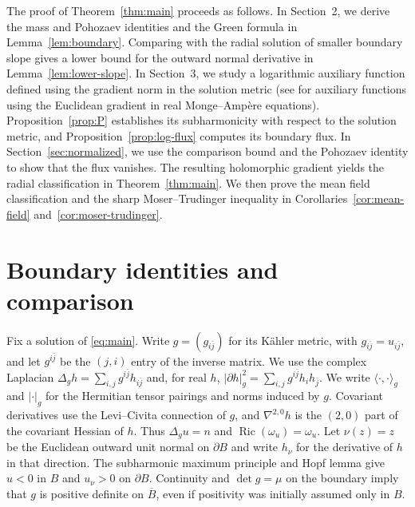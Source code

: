 \documentclass[11pt]{article}
\newcommand{\Ric}{\operatorname{Ric}}
\begin{document}
The proof of Theorem~\ref{thm:main} proceeds as follows.
In Section~2, we derive the mass and Pohozaev identities and
the Green formula in Lemma~\ref{lem:boundary}. Comparing with
the radial solution of smaller boundary slope gives a lower
bound for the outward normal derivative in
Lemma~\ref{lem:lower-slope}. In Section~3, we study a logarithmic auxiliary function defined
using the gradient norm in the solution metric (see
\cite{Enache2014} for auxiliary functions using the Euclidean
gradient in real Monge--Amp\`ere equations).
Proposition~\ref{prop:P} establishes its subharmonicity with
respect to the solution metric, and
Proposition~\ref{prop:log-flux} computes its boundary flux. 
In Section~\ref{sec:normalized}, we use the
comparison bound and the Pohozaev identity to show that the
flux vanishes. The resulting holomorphic gradient yields the
radial classification in Theorem~\ref{thm:main}. We then prove
the mean field classification and the sharp Moser--Trudinger
inequality in Corollaries~\ref{cor:mean-field}
and~\ref{cor:moser-trudinger}.

\section{Boundary identities and comparison}

Fix a solution of \eqref{eq:main}. Write $g=(g_{i\bar j})$ for its
K\"ahler metric, with $g_{i\bar j}=u_{i\bar j}$, and let
$g^{i\bar j}$ be the $(j,i)$ entry of the inverse matrix.
We use the complex Laplacian
$\Delta_gh=\sum_{i,j}g^{i\bar j}h_{i\bar j}$ and, for real $h$,
$|\partial h|_g^2=\sum_{i,j}g^{i\bar j}h_i h_{\bar j}$.
We write $\langle\cdot,\cdot\rangle_g$ and $|\cdot|_g$ for the
Hermitian tensor pairings and norms induced by $g$.
Covariant derivatives use the Levi--Civita connection of $g$, and
$\nabla^{2,0}h$ is the $(2,0)$ part of the covariant Hessian of $h$.
Thus $\Delta_gu=n$ and $\Ric(\omega_u)=\omega_u$.
Let $\nu(z)=z$ be the Euclidean outward unit normal on $\partial B$
and write $h_\nu$ for the derivative of $h$ in that direction.
The subharmonic maximum principle and Hopf lemma give $u<0$ in $B$
and $u_\nu>0$ on $\partial B$. Continuity and $\det g=\mu$ on the boundary imply
that $g$ is positive definite on $\overline B$, even if positivity
was initially assumed only in $B$.
\end{document}
